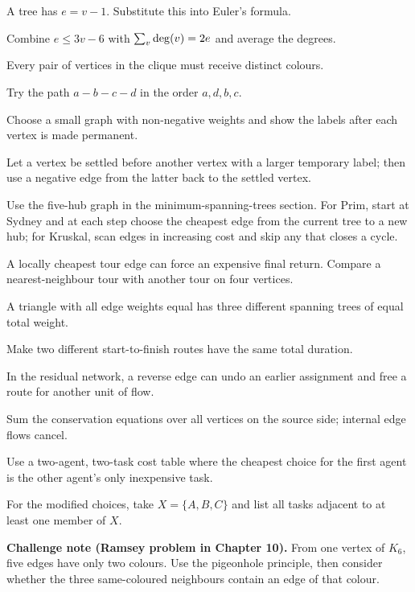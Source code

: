 \begin{description}[style=nextline]
\item[7.3] A tree has $e=v-1$. Substitute this into Euler's formula.
\item[7.4] Combine $e\leq3v-6$ with $\sum_v\operatorname{deg}(v)=2e$ and average the degrees.
\item[8.3] Every pair of vertices in the clique must receive distinct colours.
\item[8.4] Try the path $a-b-c-d$ in the order $a,d,b,c$.
\item[9.1] Choose a small graph with non-negative weights and show the labels after each vertex is made permanent.
\item[9.2] Let a vertex be settled before another vertex with a larger temporary label; then use a negative edge from the latter back to the settled vertex.
\item[9.3] Use the five-hub graph in the minimum-spanning-trees section. For Prim, start at Sydney and at each step choose the cheapest edge from the current tree to a new hub; for Kruskal, scan edges in increasing cost and skip any that closes a cycle.
\item[9.4] A locally cheapest tour edge can force an expensive final return. Compare a nearest-neighbour tour with another tour on four vertices.
\item[B.2] A triangle with all edge weights equal has three different spanning trees of equal total weight.
\item[C.2] Make two different start-to-finish routes have the same total duration.
\item[D.2] In the residual network, a reverse edge can undo an earlier assignment and free a route for another unit of flow.
\item[D.3] Sum the conservation equations over all vertices on the source side; internal edge flows cancel.
\item[E.3] Use a two-agent, two-task cost table where the cheapest choice for the first agent is the other agent's only inexpensive task.
\item[E.4] For the modified choices, take $X=\{A,B,C\}$ and list all tasks adjacent to at least one member of $X$.
\end{description}
\textbf{Challenge note (Ramsey problem in Chapter 10).} From one vertex of $K_6$, five edges have only two colours. Use the pigeonhole principle, then consider whether the three same-coloured neighbours contain an edge of that colour.
